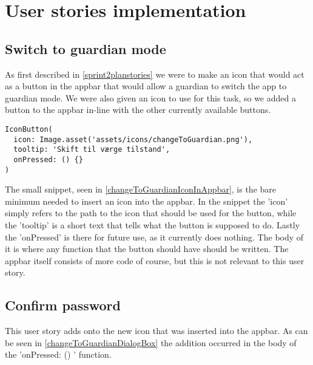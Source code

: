 \section{User stories implementation}

\subsection{Switch to guardian mode}
As first described in \autoref{sprint2planstories} we were to make an icon that would act as a button in the appbar that would allow a guardian to switch the app to guardian mode.
We were also given an icon to use for this task, so we added a button to the appbar in-line with the other currently available buttons.



\lstset{
  caption=The code used to insert the change to guardian icon in the appbar,
  label=changeToGuardianIconInAppbar
}

\begin{lstlisting}
IconButton(
  icon: Image.asset('assets/icons/changeToGuardian.png'),
  tooltip: 'Skift til værge tilstand', 
  onPressed: () {}
)
\end{lstlisting}

The small snippet, seen in \autoref{changeToGuardianIconInAppbar}, is the bare minimum needed to insert an icon into the appbar. 
In the snippet the 'icon' simply refers to the path to the icon that should be used for the button, while the 'tooltip' is a short text that tells what the button is supposed to do. 
Lastly the 'onPressed' is there for future use, as it currently does nothing. 
The body of it is where any function that the button should have should be written.
The appbar itself consists of more code of course, but this is not relevant to this user story.

\subsection{Confirm password}
This user story adds onto the new icon that was inserted into the appbar. 
As can be seen in \autoref{changeToGuardianDialogBox} the addition occurred in the body of the 'onPressed: () {}' function.

